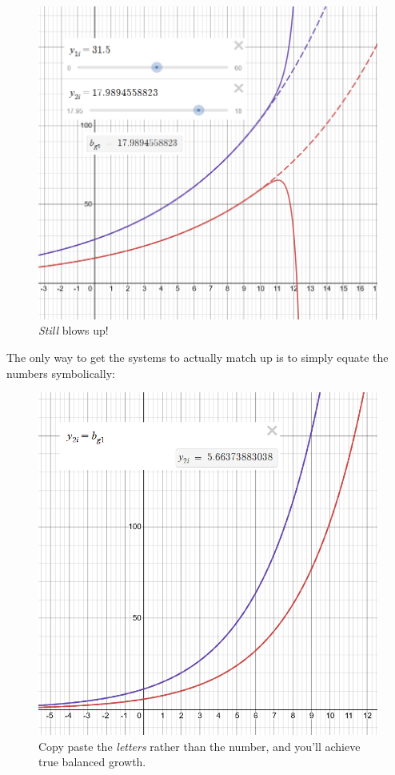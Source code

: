 \documentclass{article}
\theoremstyle{theorem}
\begin{document}
\begin{figure}[H]
\centering
\includegraphics[scale=0.7]{Images/stillMorePrecision}
\caption{\emph{Still} blows up!}
\end{figure} 
The only way to get the systems to actually match up is to simply equate the numbers symbolically:
\begin{figure}[H]
\centering
\includegraphics[scale=0.7]{Images/trulyBalanced}
\caption{Copy paste the \emph{letters} rather than the number, and you'll achieve true balanced growth.}
\end{figure} 
\end{document}
